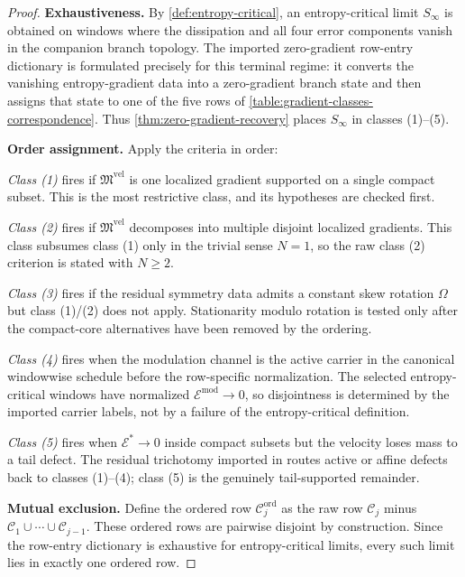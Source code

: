 \documentclass[11pt]{amsart}
\numberwithin{equation}{section}
\theoremstyle{plain}
\theoremstyle{definition}
\theoremstyle{remark}
\newcommand{\Err}{\mathcal E}
\begin{document}
\begin{proof}
\textbf{Exhaustiveness.}  By \cref{def:entropy-critical}, an
entropy-critical limit \(S_\infty\) is obtained on windows where the
dissipation and all four error components vanish in the companion branch
topology.  The imported zero-gradient row-entry dictionary
 is formulated precisely for
this terminal regime: it converts the vanishing entropy-gradient data into a
zero-gradient branch state and then assigns that state to one of the five rows
of \cref{table:gradient-classes-correspondence}.  Thus
\cref{thm:zero-gradient-recovery} places \(S_\infty\) in classes (1)--(5).

\textbf{Order assignment.}  Apply the criteria in order:

\emph{Class (1)} fires if \(\mathfrak M^{\mathrm{vel}}\) is one localized
gradient supported on a single compact subset.  This is the most
restrictive class, and its hypotheses are checked first.

\emph{Class (2)} fires if \(\mathfrak M^{\mathrm{vel}}\) decomposes into
multiple disjoint localized gradients.  This class subsumes class (1) only
in the trivial sense \(N=1\), so the raw class (2) criterion is stated with
\(N\ge2\).

\emph{Class (3)} fires if the residual symmetry data admits a constant
skew rotation \(\Omega\) but
class (1)/(2) does not apply.  Stationarity modulo rotation is
tested only after the compact-core alternatives have been removed by the
ordering.

\emph{Class (4)} fires when the modulation channel is the active carrier in
the canonical windowwise schedule before the row-specific normalization.  The
selected entropy-critical windows have normalized \(\Err^{\mathrm{mod}}\to0\),
so disjointness is determined by the imported carrier labels, not by a failure
of the entropy-critical definition.

\emph{Class (5)} fires when \(\Err^{*}\to0\) inside compact subsets but
the velocity loses mass to a tail defect.  The residual trichotomy imported in
 routes active or affine defects back to
classes (1)--(4); class (5) is the genuinely tail-supported remainder.

\textbf{Mutual exclusion.}  Define the ordered row
\(\mathcal C_j^{\mathrm{ord}}\) as the raw row \(\mathcal C_j\) minus
\(\mathcal C_1\cup\cdots\cup\mathcal C_{j-1}\).  These ordered rows are
pairwise disjoint by construction.  Since the row-entry dictionary is
exhaustive for entropy-critical limits, every such limit lies in exactly one
ordered row.
\end{proof}
\end{document}
